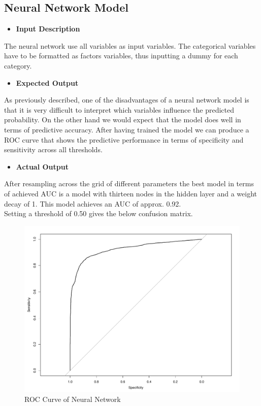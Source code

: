       \subsection{Neural Network Model}
      \begin{itemize}
      	\item \textbf{Input Description}
      \end{itemize}
      \noindent The neural network use all variables as input variables. The categorical variables have to be formatted as factors variables, thus inputting a dummy for each category. 
      \\
      \begin{itemize}
      	\item \textbf{Expected Output}
      \end{itemize}
      As previously described, one of the disadvantages of a neural network model is that it is very difficult to interpret which variables influence the predicted probability. On the other hand we would expect that the model does well in terms of predictive accuracy. After having trained the model we can produce a ROC curve that shows the predictive performance in terms of specificity and sensitivity across all thresholds.\\   
      \begin{itemize}
      	\item \textbf{Actual Output}
      \end{itemize}
      \noindent After resampling across the grid of different parameters the best model in terms of achieved AUC is a model with thirteen nodes in the hidden layer and a weight decay of 1. This model achieves an AUC of approx. 0.92.\\
      Setting a threshold of 0.50 gives the below confusion matrix.
      \begin{figure}[htbp] 
      	\centering
      	\includegraphics[width=4.5in]{NN_ROC_plot.pdf} 
      	\caption{ROC Curve of Neural Network}\label{fig:2} 
      \end{figure}
